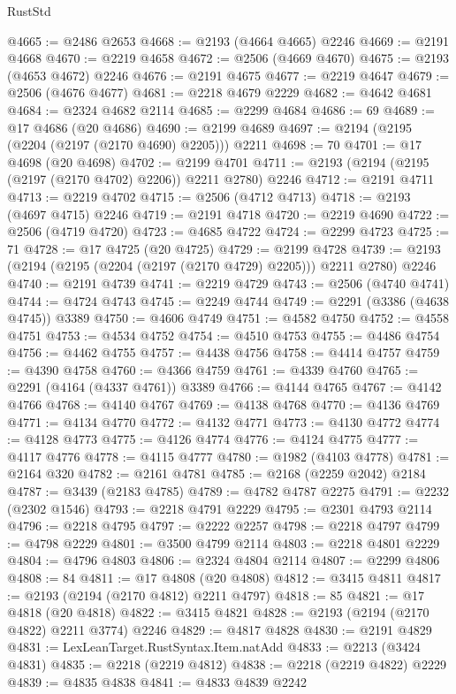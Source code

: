 \begin{lexlean}{RustStd}
\begin{coremodule}
@4665 := @2486 @2653
@4668 := @2193 (@4664 @4665) @2246
@4669 := @2191 @4668
@4670 := @2219 @4658
@4672 := @2506 (@4669 @4670)
@4675 := @2193 (@4653 @4672) @2246
@4676 := @2191 @4675
@4677 := @2219 @4647
@4679 := @2506 (@4676 @4677)
@4681 := @2218 @4679 @2229
@4682 := @4642 @4681
@4684 := @2324 @4682 @2114
@4685 := @2299 @4684
@4686 := 69
@4689 := @17 @4686 (@20 @4686)
@4690 := @2199 @4689
@4697 := @2194 (@2195 (@2204 (@2197 (@2170 @4690) @2205))) @2211
@4698 := 70
@4701 := @17 @4698 (@20 @4698)
@4702 := @2199 @4701
@4711 := @2193 (@2194 (@2195 (@2197 (@2170 @4702) @2206)) @2211 @2780) @2246
@4712 := @2191 @4711
@4713 := @2219 @4702
@4715 := @2506 (@4712 @4713)
@4718 := @2193 (@4697 @4715) @2246
@4719 := @2191 @4718
@4720 := @2219 @4690
@4722 := @2506 (@4719 @4720)
@4723 := @4685 @4722
@4724 := @2299 @4723
@4725 := 71
@4728 := @17 @4725 (@20 @4725)
@4729 := @2199 @4728
@4739 := @2193 (@2194 (@2195 (@2204 (@2197 (@2170 @4729) @2205))) @2211 @2780) @2246
@4740 := @2191 @4739
@4741 := @2219 @4729
@4743 := @2506 (@4740 @4741)
@4744 := @4724 @4743
@4745 := @2249 @4744
@4749 := @2291 (@3386 (@4638 @4745)) @3389
@4750 := @4606 @4749
@4751 := @4582 @4750
@4752 := @4558 @4751
@4753 := @4534 @4752
@4754 := @4510 @4753
@4755 := @4486 @4754
@4756 := @4462 @4755
@4757 := @4438 @4756
@4758 := @4414 @4757
@4759 := @4390 @4758
@4760 := @4366 @4759
@4761 := @4339 @4760
@4765 := @2291 (@4164 (@4337 @4761)) @3389
@4766 := @4144 @4765
@4767 := @4142 @4766
@4768 := @4140 @4767
@4769 := @4138 @4768
@4770 := @4136 @4769
@4771 := @4134 @4770
@4772 := @4132 @4771
@4773 := @4130 @4772
@4774 := @4128 @4773
@4775 := @4126 @4774
@4776 := @4124 @4775
@4777 := @4117 @4776
@4778 := @4115 @4777
@4780 := @1982 (@4103 @4778)
@4781 := @2164 @320
@4782 := @2161 @4781
@4785 := @2168 (@2259 @2042) @2184
@4787 := @3439 (@2183 @4785)
@4789 := @4782 @4787 @2275
@4791 := @2232 (@2302 @1546)
@4793 := @2218 @4791 @2229
@4795 := @2301 @4793 @2114
@4796 := @2218 @4795
@4797 := @2222 @2257
@4798 := @2218 @4797
@4799 := @4798 @2229
@4801 := @3500 @4799 @2114
@4803 := @2218 @4801 @2229
@4804 := @4796 @4803
@4806 := @2324 @4804 @2114
@4807 := @2299 @4806
@4808 := 84
@4811 := @17 @4808 (@20 @4808)
@4812 := @3415 @4811
@4817 := @2193 (@2194 (@2170 @4812) @2211 @4797)
@4818 := 85
@4821 := @17 @4818 (@20 @4818)
@4822 := @3415 @4821
@4828 := @2193 (@2194 (@2170 @4822) @2211 @3774) @2246
@4829 := @4817 @4828
@4830 := @2191 @4829
@4831 := LexLeanTarget.RustSyntax.Item.natAdd
@4833 := @2213 (@3424 @4831)
@4835 := @2218 (@2219 @4812)
@4838 := @2218 (@2219 @4822) @2229
@4839 := @4835 @4838
@4841 := @4833 @4839 @2242

\end{coremodule}
\end{lexlean}
